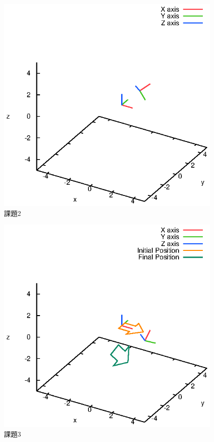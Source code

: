 \documentclass[a4paper,10pt]{jsarticle}
\begin{document}
\begin{figure}[htb]
  \begin{center}
    \includegraphics[clip,width=14cm]{fig/eps/2.eps}
  \end{center}
  \caption{課題2}
  \label{fig:課題2}
\end{figure}

\begin{figure}[htb]
  \begin{center}
    \includegraphics[clip,width=14cm]{fig/eps/3.eps}
  \end{center}
  \caption{課題3}
  \label{fig:課題3}
\end{figure}
\end{document}
